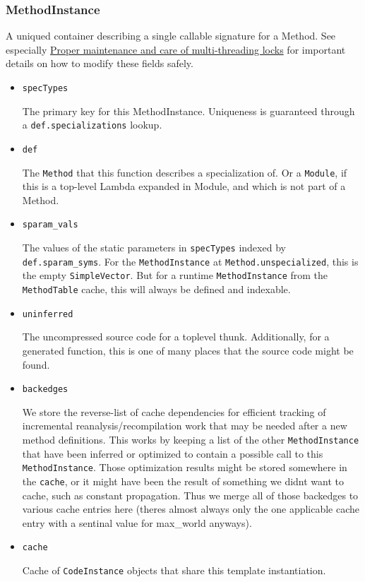 \hypertarget{2584833319372808594}{}


\subsubsection{MethodInstance}



A unique{\textquotesingle}d container describing a single callable signature for a Method. See especially \hyperlink{17047801949293328593}{Proper maintenance and care of multi-threading locks} for important details on how to modify these fields safely.



\begin{itemize}
\item \texttt{specTypes}

The primary key for this MethodInstance. Uniqueness is guaranteed through a \texttt{def.specializations} lookup.


\item \texttt{def}

The \texttt{Method} that this function describes a specialization of. Or a \texttt{Module}, if this is a top-level Lambda expanded in Module, and which is not part of a Method.


\item \texttt{sparam\_vals}

The values of the static parameters in \texttt{specTypes} indexed by \texttt{def.sparam\_syms}. For the \texttt{MethodInstance} at \texttt{Method.unspecialized}, this is the empty \texttt{SimpleVector}. But for a runtime \texttt{MethodInstance} from the \texttt{MethodTable} cache, this will always be defined and indexable.


\item \texttt{uninferred}

The uncompressed source code for a toplevel thunk. Additionally, for a generated function, this is one of many places that the source code might be found.


\item \texttt{backedges}

We store the reverse-list of cache dependencies for efficient tracking of incremental reanalysis/recompilation work that may be needed after a new method definitions. This works by keeping a list of the other \texttt{MethodInstance} that have been inferred or optimized to contain a possible call to this \texttt{MethodInstance}. Those optimization results might be stored somewhere in the \texttt{cache}, or it might have been the result of something we didn{\textquotesingle}t want to cache, such as constant propagation. Thus we merge all of those backedges to various cache entries here (there{\textquotesingle}s almost always only the one applicable cache entry with a sentinal value for max\_world anyways).


\item \texttt{cache}

Cache of \texttt{CodeInstance} objects that share this template instantiation.

\end{itemize}


